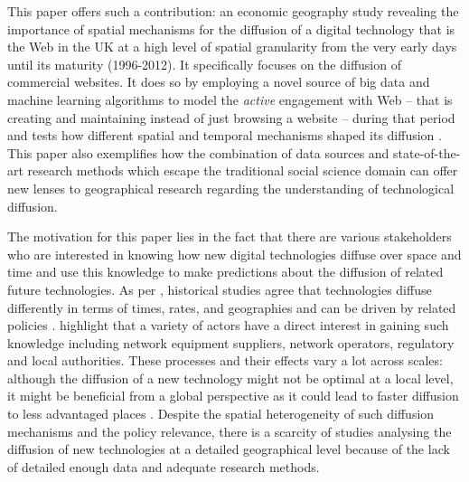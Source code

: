 \documentclass[
  authoryear,
  preprint,
  3p]{elsarticle}
\begin{document}
This paper offers such a contribution: an economic geography study
revealing the importance of spatial mechanisms for the diffusion of a
digital technology that is the Web in the UK at a high level of spatial
granularity from the very early days until its maturity (1996-2012). It
specifically focuses on the diffusion of commercial websites. It does so
by employing a novel source of big data and machine learning algorithms
to model the \emph{active} engagement with Web -- that is creating and
maintaining instead of just browsing a website -- during that period and
tests how different spatial and temporal mechanisms shaped its diffusion
\citep{tranosuk}. This paper also exemplifies how the combination of
data sources and state-of-the-art research methods which escape the
traditional social science domain can offer new lenses to geographical
research regarding the understanding of technological diffusion.

The motivation for this paper lies in the fact that there are various
stakeholders who are interested in knowing how new digital technologies
diffuse over space and time and use this knowledge to make predictions
about the diffusion of related future technologies. As per
\citet{leibowicz2016representing}, historical studies agree that
technologies diffuse differently in terms of times, rates, and
geographies and can be driven by related policies \citep{victor1993}.
\citet{meade2021modelling} highlight that a variety of actors have a
direct interest in gaining such knowledge including network equipment
suppliers, network operators, regulatory and local authorities. These
processes and their effects vary a lot across scales: although the
diffusion of a new technology might not be optimal at a local level, it
might be beneficial from a global perspective as it could lead to faster
diffusion to less advantaged places \citep{leibowicz2016representing}.
Despite the spatial heterogeneity of such diffusion mechanisms and the
policy relevance, there is a scarcity of studies analysing the diffusion
of new technologies at a detailed geographical level because of the lack
of detailed enough data and adequate research methods.
\end{document}
